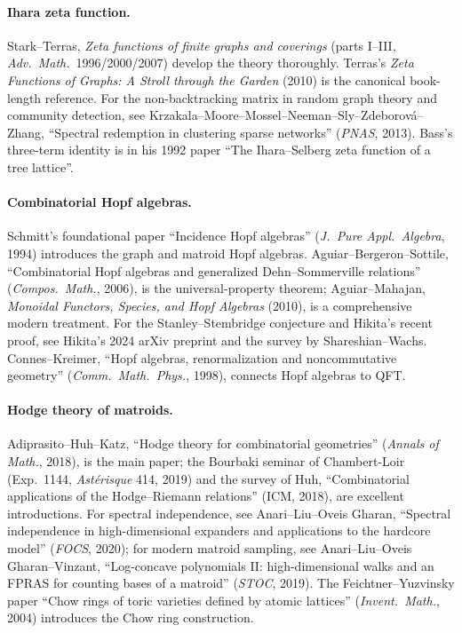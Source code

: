 \paragraph{Ihara zeta function.} Stark--Terras, \emph{Zeta functions
of finite graphs and coverings} (parts I--III, \emph{Adv.\ Math.}\
1996/2000/2007) develop the theory thoroughly. Terras's
\emph{Zeta Functions of Graphs: A Stroll through the Garden} (2010)
is the canonical book-length reference. For the non-backtracking
matrix in random graph theory and community detection, see
Krzakala--Moore--Mossel--Neeman--Sly--Zdeborov\'a--Zhang,
``Spectral redemption in clustering sparse networks'' (\emph{PNAS},
2013). Bass's three-term identity is in his 1992 paper
``The Ihara--Selberg zeta function of a tree lattice''.

\paragraph{Combinatorial Hopf algebras.} Schmitt's foundational paper
``Incidence Hopf algebras'' (\emph{J.\ Pure Appl.\ Algebra}, 1994)
introduces the graph and matroid Hopf algebras. Aguiar--Bergeron--Sottile,
``Combinatorial Hopf algebras and generalized Dehn--Sommerville
relations'' (\emph{Compos.\ Math.}, 2006), is the universal-property
theorem; Aguiar--Mahajan, \emph{Monoidal Functors, Species, and Hopf
Algebras} (2010), is a comprehensive modern treatment. For the
Stanley--Stembridge conjecture and Hikita's recent proof, see
Hikita's 2024 arXiv preprint and the survey by Shareshian--Wachs.
Connes--Kreimer, ``Hopf algebras, renormalization and noncommutative
geometry'' (\emph{Comm.\ Math.\ Phys.}, 1998), connects Hopf algebras
to QFT.

\paragraph{Hodge theory of matroids.} Adiprasito--Huh--Katz,
``Hodge theory for combinatorial geometries'' (\emph{Annals of Math.},
2018), is the main paper; the Bourbaki seminar of Chambert-Loir
(Exp.~1144, \emph{Ast\'erisque} 414, 2019) and the survey of Huh,
``Combinatorial applications of the
Hodge--Riemann relations'' (ICM, 2018), are excellent introductions.
For spectral independence, see Anari--Liu--Oveis Gharan,
``Spectral independence in high-dimensional expanders and
applications to the hardcore model'' (\emph{FOCS}, 2020); for modern
matroid sampling, see
Anari--Liu--Oveis Gharan--Vinzant, ``Log-concave polynomials II:
high-dimensional walks and an FPRAS for counting bases of a matroid''
(\emph{STOC}, 2019). The Feichtner--Yuzvinsky paper ``Chow rings of
toric varieties defined by atomic lattices'' (\emph{Invent.\ Math.},
2004) introduces the Chow ring construction.

